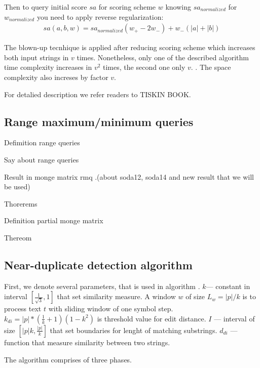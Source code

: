 Then to query initial score $sa$ for scoring scheme $w$
knowing $sa_{normalized}$ for $w_{normalized}$ you need to apply reverse regularization:
\begin{equation}
    \begin{aligned}
    sa(a,b,w) = sa_{normalized}  (w_{+} - 2w_{-}) +  w_{-} (|a| + |b|)
\end{aligned}
\end{equation}

The blown-up tecnhique is applied after reducing scoring scheme
which increases both input strings in $v$ times.
Nonetheless, only one of the described algorithm time complexity increases in $v^{2}$ times, the second one only $v$. .
The space complexity also increses by factor $v$. 


For detalied description we refer readers to TISKIN BOOK\cite{}.

 
\subsection{Range maximum/minimum queries}


Defimition range queries


Say about range queries 

Result in monge matrix rmq .(about soda12, soda14 and new result that we will be used)


Thorerems  

Definition partial monge matrix

Thereom 


\subsection{Near-duplicate detection algorithm}
First, we denote several parameters, that is used in algorithm \cite{}.
$k$--- constant in interval $[\frac{1}{\sqrt{3}},1]$ that set similarity measure.  
A window $w$ of size $L_{w} = |p|/k$ is to process text $t$ with
sliding window of one symbol step.
$k_{di} = |p|*(\frac{1}{k}+1)(1-k^2)$ is threshold value for edit distance.
$I$ --- interval of size $[|p|k,\frac{|p|}{k}]$ that set boundaries for lenght of matching substrings.
$d_{di}$ --- function that measure similarity between two strings.

The algorithm comprises of three phases.

